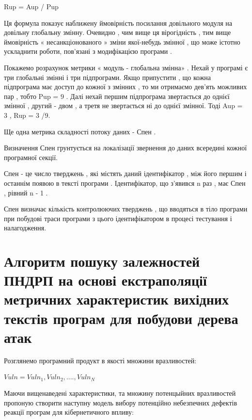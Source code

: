 \documentclass[oneside,final,14pt]{extreport}
\begin{document}
Rup = Aup / Pup

Ця формула показує наближену ймовірність посилання довільного модуля на довільну глобальну змінну. Очевидно , чим вище ця вірогідність , тим вище ймовірність « несанкціонованого » зміни якої-небудь змінної , що може істотно ускладнити роботи, пов'язані з модифікацією програми .

Покажемо розрахунок метрики « модуль - глобальна змінна» . Нехай у програмі є три глобальні змінні і три підпрограми. Якщо припустити , що кожна підпрограма має доступ до кожної з змінних , то ми отримаємо дев'ять можливих пар , тобто Pup = 9 . Далі нехай першим підпрограма звертається до однієї змінної , другий - двом , а третя не звертається ні до однієї змінної. Тоді Aup = 3 , Rup = 3 /9.

Ще одна метрика складності потоку даних - Спен .

Визначення Спен грунтується на локалізації звернення до даних всередині кожної програмної секції.

Спен - це число тверджень , які містять даний ідентифікатор , між його першим і останнім появою в тексті програми . Ідентифікатор, що з'явився n раз , має Спен , рівний n - 1 .

Спен визначає кількість контролюючих тверджень , що вводяться в тіло програми при побудові траси програми з цього ідентифікатором в процесі тестування і налагодження.


\section{Алгоритм пошуку залежностей ПНДРП на основі екстраполяції метричних характеристик вихідних текстів програм для побудови дерева атак}
\label{2section:id13}
Розглянемо програмний продукт в якості множини вразливостей:

$Vuln = {Vuln_1,Vuln_2,....,Vuln_N}$

Маючи вищенаведені характеристики, та множину потенцыйних вразливостей пропоную створити наступну модель вибору потенційно небезпечних дефектів реакції програм для кібернетичного впливу:
\end{document}
